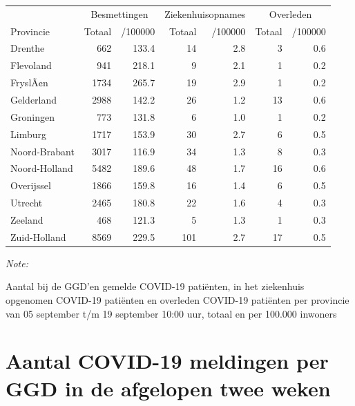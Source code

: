 \documentclass[
  english,
  man,floatsintext]{apa6}
\begin{document}
\begin{table}
\centering
\begin{threeparttable}
\begin{tabular}{lrrrrrr}
\toprule
\multicolumn{1}{c}{ } & \multicolumn{2}{c}{Besmettingen} & \multicolumn{2}{c}{Ziekenhuisopnames} & \multicolumn{2}{c}{Overleden} \\
\cmidrule(l{3pt}r{3pt}){2-3} \cmidrule(l{3pt}r{3pt}){4-5} \cmidrule(l{3pt}r{3pt}){6-7}
Provincie & Totaal & /100000 & Totaal & /100000 & Totaal & /100000\\
\midrule
Drenthe & 662 & 133.4 & 14 & 2.8 & 3 & 0.6\\
Flevoland & 941 & 218.1 & 9 & 2.1 & 1 & 0.2\\
FryslÃ¢n & 1734 & 265.7 & 19 & 2.9 & 1 & 0.2\\
Gelderland & 2988 & 142.2 & 26 & 1.2 & 13 & 0.6\\
Groningen & 773 & 131.8 & 6 & 1.0 & 1 & 0.2\\
Limburg & 1717 & 153.9 & 30 & 2.7 & 6 & 0.5\\
Noord-Brabant & 3017 & 116.9 & 34 & 1.3 & 8 & 0.3\\
Noord-Holland & 5482 & 189.6 & 48 & 1.7 & 16 & 0.6\\
Overijssel & 1866 & 159.8 & 16 & 1.4 & 6 & 0.5\\
Utrecht & 2465 & 180.8 & 22 & 1.6 & 4 & 0.3\\
Zeeland & 468 & 121.3 & 5 & 1.3 & 1 & 0.3\\
Zuid-Holland & 8569 & 229.5 & 101 & 2.7 & 17 & 0.5\\
\bottomrule
\end{tabular}
\begin{tablenotes}
\item \textit{Note: } 
\item Aantal bij de GGD’en gemelde COVID-19 patiënten, in het ziekenhuis opgenomen COVID-19 patiënten en overleden COVID-19 patiënten per provincie van 05 september t/m 19 september 10:00 uur, totaal en per 100.000 inwoners
\end{tablenotes}
\end{threeparttable}
\end{table}

\newpage

\hypertarget{aantal-covid-19-meldingen-per-ggd-in-de-afgelopen-twee-weken}{%
\section{Aantal COVID-19 meldingen per GGD in de afgelopen twee weken}\label{aantal-covid-19-meldingen-per-ggd-in-de-afgelopen-twee-weken}}
\end{document}
